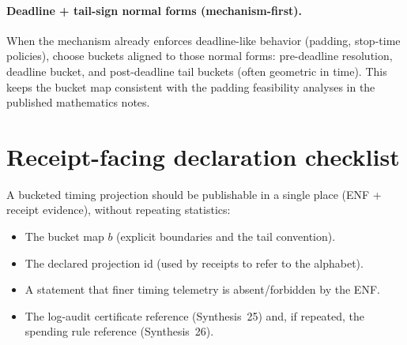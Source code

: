 \documentclass[11pt]{article}
\begin{document}
\paragraph{Deadline + tail-sign normal forms (mechanism-first).}
When the mechanism already enforces deadline-like behavior (padding, stop-time policies),
choose buckets aligned to those normal forms:
pre-deadline resolution, deadline bucket, and post-deadline tail buckets (often geometric in time).
This keeps the bucket map consistent with the padding feasibility analyses in the published mathematics notes. \cite{pub:stopnormal, pub:prefixcaps}

\section{Receipt-facing declaration checklist}
A bucketed timing projection should be publishable in a single place (ENF + receipt evidence), without repeating statistics:
\begin{itemize}[leftmargin=*]
\item The bucket map $b$ (explicit boundaries and the tail convention).
\item The declared projection id (used by receipts to refer to the alphabet).
\item A statement that finer timing telemetry is absent/forbidden by the ENF. \cite{series:traceifaces}
\item The log-audit certificate reference (Synthesis~25) and, if repeated, the spending rule reference (Synthesis~26). \cite{series:stataudit,series:anytimespend}
\end{itemize}
\end{document}
